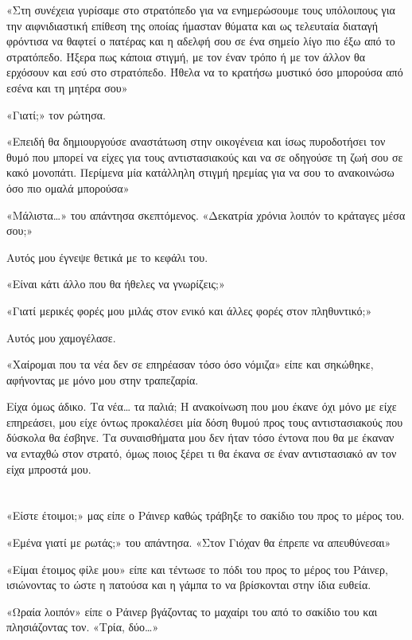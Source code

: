\documentclass[12pt,twoside, openany]{book}
\begin{document}
«Στη συνέχεια γυρίσαμε στο στρατόπεδο για να ενημερώσουμε τους υπόλοιπους για την αιφνιδιαστική επίθεση της οποίας ήμασταν θύματα και ως τελευταία διαταγή φρόντισα να θαφτεί ο πατέρας και η αδελφή σου σε ένα σημείο λίγο πιο έξω από το στρατόπεδο. Ήξερα πως κάποια στιγμή, με τον έναν τρόπο ή με τον άλλον θα ερχόσουν και εσύ στο στρατόπεδο. Ήθελα να το κρατήσω μυστικό όσο μπορούσα από εσένα και τη μητέρα σου»

«Γιατί;» τον ρώτησα.

«Επειδή θα δημιουργούσε αναστάτωση στην οικογένεια και ίσως πυροδοτήσει τον θυμό που μπορεί να είχες για τους αντιστασιακούς και να σε οδηγούσε τη ζωή σου σε κακό μονοπάτι. Περίμενα μία κατάλληλη στιγμή ηρεμίας για να σου το ανακοινώσω όσο πιο ομαλά μπορούσα»

«Μάλιστα…» του απάντησα σκεπτόμενος. «Δεκατρία χρόνια λοιπόν το κράταγες μέσα σου;»

Αυτός μου έγνεψε θετικά με το κεφάλι του.

«Είναι κάτι άλλο που θα ήθελες να γνωρίζεις;»

«Γιατί μερικές φορές μου μιλάς στον ενικό και άλλες φορές στον πληθυντικό;»

Αυτός μου χαμογέλασε. 

«Χαίρομαι που τα νέα δεν σε επηρέασαν τόσο όσο νόμιζα» είπε και σηκώθηκε, αφήνοντας με μόνο μου στην τραπεζαρία.

Είχα όμως άδικο. Τα νέα… τα παλιά; Η ανακοίνωση που μου έκανε όχι μόνο με είχε επηρεάσει, μου είχε όντως προκαλέσει μία δόση θυμού προς τους αντιστασιακούς που δύσκολα θα έσβηνε. Τα συναισθήματα μου δεν ήταν τόσο έντονα που θα με έκαναν να ενταχθώ στον στρατό, όμως ποιος ξέρει τι θα έκανα σε έναν αντιστασιακό αν τον είχα μπροστά μου.


\chapter{}


«Είστε έτοιμοι;» μας είπε ο Ράινερ καθώς τράβηξε το σακίδιο του προς το μέρος του.

«Εμένα γιατί με ρωτάς;» του απάντησα. «Στον Γιόχαν θα έπρεπε να απευθύνεσαι»

«Είμαι έτοιμος φίλε μου» είπε και τέντωσε το πόδι του προς το μέρος του Ράινερ, ισιώνοντας το ώστε η πατούσα και η γάμπα το να βρίσκονται στην ίδια ευθεία.

«Ωραία λοιπόν» είπε ο Ράινερ βγάζοντας το μαχαίρι του από το σακίδιο του και πλησιάζοντας τον. «Τρία, δύο…»
\end{document}

